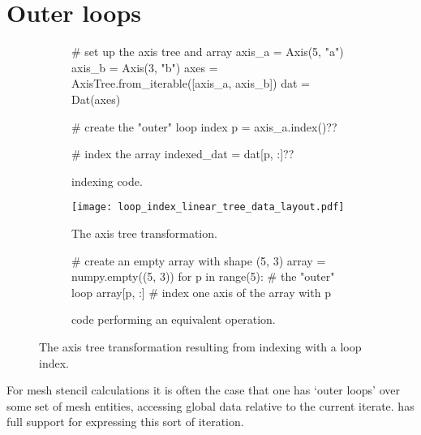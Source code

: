 \documentclass[thesis]{subfiles}
\begin{document}
\section{Outer loops}
\label{sec:outer_loops}

\begin{figure}
  \centering

  \begin{subfigure}{.9\textwidth}
    \begin{pyalg2}
      # set up the axis tree and array
      axis_a = Axis(5, "a")
      axis_b = Axis(3, "b")
      axes = AxisTree.from_iterable([axis_a, axis_b])
      dat = Dat(axes)

      # create the "outer" loop index
      p = axis_a.index()?\label{code:loop_index_init}?

      # index the array
      indexed_dat = dat[p, :]?\label{code:loop_index_apply}?
    \end{pyalg2}

    \caption{ indexing code.}
    \label{fig:loop_index_code}
  \end{subfigure}

  \vspace{1em}

  \begin{subfigure}{\textwidth}
    \centering
    \texttt{[image: loop\_index\_linear\_tree\_data\_layout.pdf]}
    \caption{
      The axis tree transformation.
    }
    \label{fig:loop_index_linear_tree_data_layout}
  \end{subfigure}

  \vspace{1em}

  \begin{subfigure}{.9\textwidth}
    \begin{pyalg2}
      # create an empty array with shape (5, 3)
      array = numpy.empty((5, 3))
      for p in range(5):           # the "outer" loop
        array[p, :]                # index one axis of the array with p
    \end{pyalg2}
    \caption{\numpy{} code performing an equivalent operation.}
    \label{fig:loop_index_numpy}
  \end{subfigure}
  \caption{
    The axis tree transformation resulting from indexing with a loop index.
  }
  \label{fig:loop_index_linear_tree_data_layout_all}
\end{figure}

For mesh stencil calculations it is often the case that one has `outer loops' over some set of mesh entities, accessing global data relative to the current iterate.
 has full support for expressing this sort of iteration.
\end{document}
